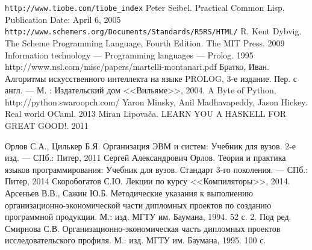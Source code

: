 \begin{thebibliography}{0}
    \verb$http://www.tiobe.com/tiobe_index$
    Peter Seibel. Practical Common Lisp. Publication Date: April 6, 2005
    \verb$http://www.schemers.org/Documents/Standards/R5RS/HTML/$
    R. Kent Dybvig. The Scheme Programming Language, Fourth Edition. The MIT Press. 2009
    Information technology — Programming languages — Prolog. 1995
    http://www.nsl.com/misc/papers/martelli-montanari.pdf
    Братко, Иван. Алгоритмы искусственного интеллекта на языке PROLOG, 3-е издание. Пер. с англ. --- М. : Издательский дом <<Вильяме>>, 2004.
    A Byte of Python, http://python.swaroopch.com/
    Yaron Minsky, Anil Madhavapeddy, Jason Hickey. Real world OCaml. 2013
    Miran Lipovača. LEARN YOU A HASKELL FOR GREAT GOOD!. 2011 

     Орлов С.А., Цилькер Б.Я. Организация ЭВМ и систем: Учебник для вузов. 2-е изд. --- СПб.: Питер, 2011
     Сергей Александрович Орлов. Теория и практика языков программирования: Учебник для вузов. Стандарт 3-го поколения. --- СПб.: Питер, 2014
     Скоробогатов С.Ю. Лекции по курсу <<Компиляторы>>, 2014.
     Арсеньев В.В., Сажин Ю.Б. Методические указания к выполнению организационно-экономической части дипломных проектов по созданию программной продукции. М.: изд. МГТУ им. Баумана, 1994. 52 с. 2.
     Под ред. Смирнова С.В. Организационно-экономическая часть дипломных проектов исследовательского профиля. М.: изд. МГТУ им. Баумана, 1995. 100 с.
\end{thebibliography}
